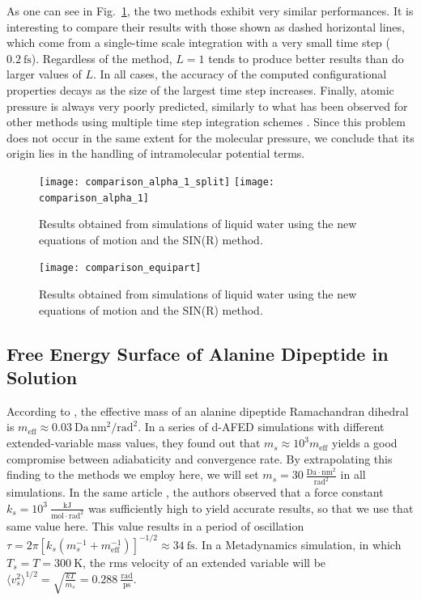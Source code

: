 \documentclass[
aip,
jcp,
reprint,
]{revtex4-1}
\begin{document}
As one can see in Fig.~\ref{fig:liquid water simulation results}, the two methods exhibit very similar performances.
It is interesting to compare their results with those shown as dashed horizontal lines, which come from a single-time scale integration with a very small time step ($0.2~\mathrm{fs}$).
Regardless of the method, $L=1$ tends to produce better results than do larger values of $L$.
In all cases, the accuracy of the computed configurational properties decays as the size of the largest time step increases.
Finally, atomic pressure is always very poorly predicted, similarly to what has been observed for other methods using multiple time step integration schemes \cite{Andoh_2017}.
Since this problem does not occur in the same extent for the molecular pressure, we conclude that its origin lies in the handling of intramolecular potential terms.

\begin{figure}[htbp!]
	\centering
	\texttt{[image: comparison\_alpha\_1\_split]}
	\texttt{[image: comparison\_alpha\_1]}
	\caption{Results obtained from simulations of liquid water using the new equations of motion and the SIN(R) method.}
	\label{fig:liquid water simulation results}
\end{figure}


\begin{figure}[htbp!]
	\centering
	\texttt{[image: comparison\_equipart]}
	\caption{Results obtained from simulations of liquid water using the new equations of motion and the SIN(R) method.}
	\label{fig:liquid water simulation results - equipartition}
\end{figure}


\subsection{Free Energy Surface of Alanine Dipeptide in Solution}

According to \citeauthor{Cuendet_2014} \cite{Cuendet_2014}, the effective mass of an alanine dipeptide Ramachandran dihedral is $m_\mathrm{eff} \approx 0.03~\mathrm{Da\,nm^2/rad^2}$.
In a series of d-AFED simulations with different extended-variable mass values, they found out that $m_s \approx 10^3 m_\mathrm{eff}$ yields a good compromise between adiabaticity and convergence rate.
By extrapolating this finding to the methods we employ here, we will set $m_s = 30~\mathrm{\frac{Da \cdot nm^2}{rad^2}}$ in all simulations.
In the same article \cite{Cuendet_2014}, the authors observed that a force constant $k_s = 10^3~\mathrm{\frac{kJ}{mol\cdot rad^2}}$ was sufficiently high to yield accurate results, so that we use that same value here.
This value results in a period of oscillation $\tau = 2 \pi [k_s (m_s^{-1} + m_\mathrm{eff}^{-1})]^{-1/2} \approx 34~\mathrm{fs}$.
In a Metadynamics simulation, in which $T_s = T = 300~\mathrm{K}$, the rms velocity of an extended variable will be $\langle v_s^2 \rangle^{1/2} = \sqrt{\frac{k T}{m_s}} = 0.288~\mathrm{\frac{rad}{ps}}$.
\end{document}
